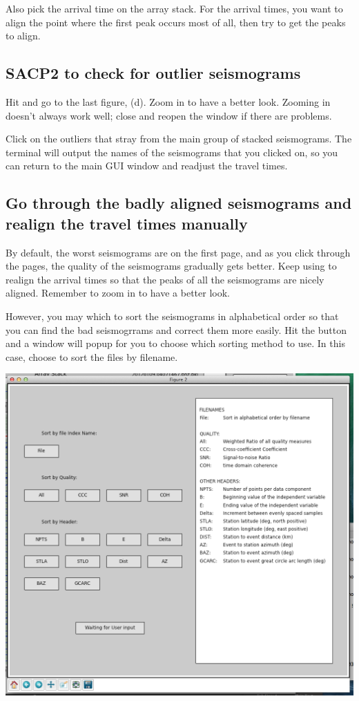 \documentclass[letterpaper,10pt,english]{sphinxmanual}
\begin{document}
Also pick the arrival time on the array stack. For the arrival times, you want to align the point where the first peak occurs most of all, then try to get the peaks to align.


\subsection{SACP2 to check for outlier seismograms}
\label{docfiles/PickingTravelTimes:sacp2-to-check-for-outlier-seismograms}
Hit and go to the last figure, (d). Zoom in to have a better look. Zooming in doesn’t always work well; close and reopen the  window if there are problems.

Click on the outliers that stray from the main group of stacked seismograms. The terminal will output the names of the seismograms that you clicked on, so you can return to the main GUI window and readjust the travel times.


\subsection{Go through the badly aligned seismograms and realign the travel times manually}
\label{docfiles/PickingTravelTimes:go-through-the-badly-aligned-seismograms-and-realign-the-travel-times-manually}
By default, the worst seismograms are on the first page, and as you click through the pages, the quality of the seismograms gradually gets better. Keep using  to realign the arrival times so that the peaks of all the seismograms are nicely aligned. Remember to zoom in to have a better look.

However, you may which to sort the seismograms in alphabetical order so that you can find the bad seismogrrams and correct them more easily. Hit the  button and a window will popup for you to choose which sorting method to use. In this case, choose to sort the files by filename.

\includegraphics{sorting-interface.png}
\end{document}
